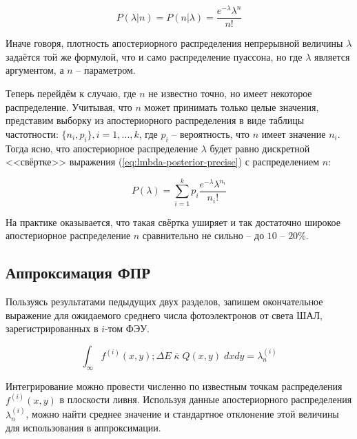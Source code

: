 \begin{equation}
	P(\lambda | n) = P(n | \lambda) = \frac{e^{-\lambda} \lambda^n}{n!}
	\label{eq:lmbda-posterior-precise}
\end{equation}

Иначе говоря, плотность апостериорного распределения непрерывной величины $\lambda$ задаётся той же формулой, что и само распределение пуассона, но где $\lambda$ является аргументом, а $n$ -- параметром.

Теперь перейдём к случаю, где $n$ не известно точно, но имеет некоторое распределение. Учитывая, что $n$ может принимать только целые значения, представим выборку из апостериорного распределения в виде таблицы частотности: $\lbrace n_i, p_i \rbrace, i = 1, ..., k$, где $p_i$ -- вероятность, что $n$ имеет значение $n_i$. Тогда ясно, что апостериорное распределение $\lambda$ будет равно дискретной <<свёртке>> выражения (\ref{eq:lmbda-posterior-precise}) с распределением $n$:

\begin{equation}
P(\lambda) = \sum_{i=1}^{k} p_i \frac{e^{-\lambda} \lambda^{n_i}}{n_i !}
\end{equation}

На практике оказывается, что такая свёртка уширяет и так достаточно широкое апостериорное распределение $n$ сравнительно не сильно -- до $10$ -- $20 \%$.


\subsection{Аппроксимация ФПР}

Пользуясь результатами педыдущих двух разделов, запишем окончательное выражение для ожидаемого среднего числа фотоэлектронов от света ШАЛ, зарегистрированных в $i$-том ФЭУ.

\begin{equation}
	\int_{\infty} f^{(i)}(x, y)
	; \Delta E \; \bar{\kappa} \; Q(x, y) \; dx dy = \lambda_n^{(i)}
\end{equation}

Интегрирование можно провести численно по известным точкам распределения $f^{(i)}(x, y)$ в плоскости ливня. Используя данные апостериорного распределения $\lambda_n^{(i)}$, можно найти среднее значение и стандартное отклонение этой величины для использования в аппроксимации.

